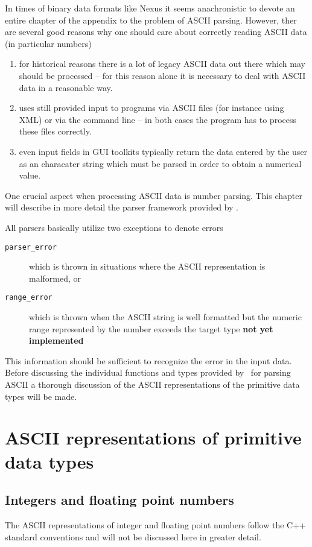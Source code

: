 
In times of binary data formats like Nexus it seems anachronistic to devote an
entire chapter of the appendix to the problem of ASCII parsing. However, 
ther are several good reasons why one should care about correctly reading 
ASCII data (in particular numbers)
\begin{enumerate}
\item for historical reasons there is a lot of legacy ASCII data out there which
may should be processed -- for this reason alone it is necessary to deal with
ASCII data in a reasonable way.
\item uses still provided input to programs via ASCII files (for instance using
XML) or via the command line -- in both cases the program has to process these
files correctly. 
\item even input fields in GUI toolkits typically return the data entered by 
the user as an characater string which must be parsed in order to obtain a 
numerical value.
\end{enumerate}

One crucial aspect when processing ASCII data is number parsing.
This chapter will describe in more detail the parser framework provided by 
\libpniio. 

All parsers basically utilize two exceptions to denote errors
\begin{description}
\item[\texttt{parser\_error}] which is thrown in situations where the ASCII 
representation is malformed, or
\item[\texttt{range\_error}] which is thrown when the ASCII string is well 
formatted but the numeric range represented by the number exceeds the 
target type {\bf not yet implemented}
\end{description}
This information should be sufficient to recognize the error in the input data. 
Before discussing the individual functions and types provided by \libpniio\ 
for parsing ASCII a thorough discussion of the ASCII representations of 
the primitive data types will be made.

\section{ASCII representations of primitive data types}

\subsection{Integers and floating point numbers}
The ASCII representations of integer and floating point numbers follow the 
C++ standard conventions and will not be discussed here in greater detail.

